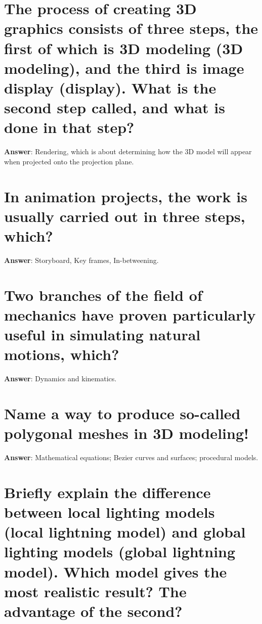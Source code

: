 \documentclass[a4paper,11pt,oneside]{book}
\begin{document}
\begin{sloppypar}
\section{The process of creating 3D graphics consists of three steps, the first of which is 3D modeling (3D modeling), and the third is image display (display). What is the second step called, and what is done in that step?}

\label{q:301:sa:en:True}

\textbf{Answer}: Rendering, which is about determining how the 3D model will appear when projected onto the projection plane.



\section{In animation projects, the work is usually carried out in three steps, which?}

\label{q:302:sa:en:True}

\textbf{Answer}: Storyboard, Key frames, In-betweening.



\section{Two branches of the field of mechanics have proven particularly useful in simulating natural motions, which?}

\label{q:303:sa:en:True}

\textbf{Answer}: Dynamics and kinematics.



\section{Name a way to produce so-called polygonal meshes in 3D modeling!}

\label{q:304:sa:en:True}

\textbf{Answer}: Mathematical equations; Bezier curves and surfaces; procedural models.



\section{Briefly explain the difference between local lighting models (local lightning model) and global lighting models (global lightning model). Which model gives the most realistic result? The advantage of the second?}


\end{sloppypar}
\end{document}
